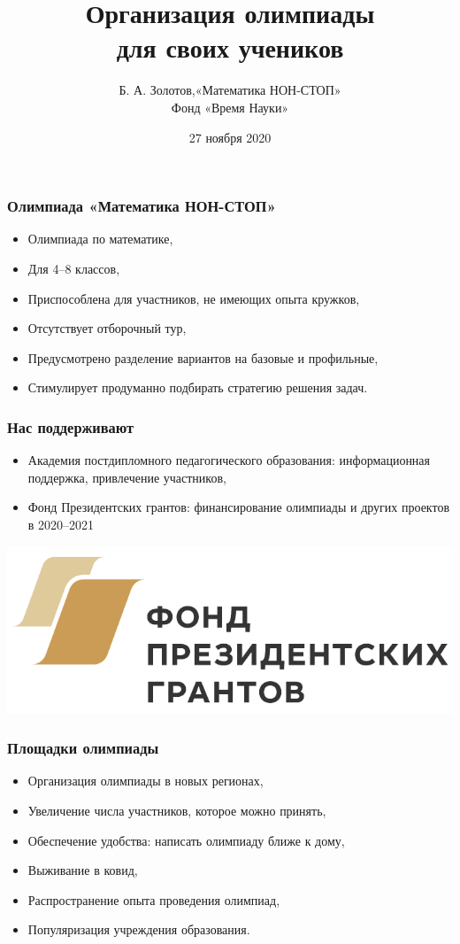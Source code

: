 \documentclass[aspectratio=1610,12pt,notheorems]{beamer}
\title[Methodic keys to MNS]
    {\bfseries Организация олимпиады \\
	для своих учеников}
\author[\ ]
	{Б. А. Золотов,\quad «Математика НОН-СТОП»\\ \vspace{0.3cm}
		{\small Фонд «Время Науки»}}
\institute[\ ]{\ }
\date{27 ноября 2020}
\begin{document}
\frame{\titlepage}

\begin{frame} \frametitle{Олимпиада «Математика НОН-СТОП»}
\begin{itemize}
	\item Олимпиада по математике, \medskip
	\item Для 4–8 классов, \medskip
	\item Приспособлена для участников, не имеющих опыта кружков, \medskip
	\item Отсутствует отборочный тур, \medskip
	\item Предусмотрено разделение вариантов на базовые и профильные, \medskip
	\item Стимулирует продуманно подбирать стратегию решения задач. \medskip
\end{itemize}
\end{frame}

\begin{frame} \frametitle{Нас поддерживают}
\begin{itemize}
	\item Академия постдипломного педагогического образования: информационная поддержка, привлечение участников, \medskip
	\item Фонд Президентских грантов: финансирование олимпиады и других проектов в 2020–2021
\end{itemize}

	\vspace{0.45cm}
	\begin{center}
		\includegraphics[scale=0.5]{fpg/fpg}
	\end{center}
\end{frame}





\begin{frame} \frametitle{Площадки олимпиады}
\begin{itemize}
	\item Организация олимпиады в новых регионах, \medskip
	\item Увеличение числа участников, которое можно принять, \medskip
	\item Обеспечение удобства: написать олимпиаду ближе к дому, \medskip
	\item Выживание в ковид, \medskip
	\item Распространение опыта проведения олимпиад, \medskip
	\item Популяризация учреждения образования. \medskip
\end{itemize}
\end{frame}
\end{document}
